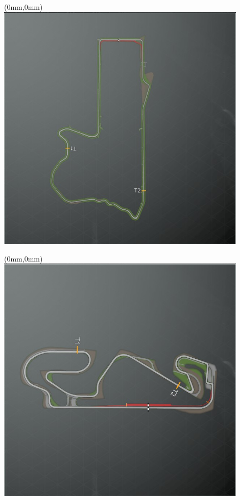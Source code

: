 \null\newpage
\begin{textblock*}{30mm}(0mm,0mm)%
\includegraphics[width=120mm]{TR/2015-05-20_00036.png}
\end{textblock*}
\null\newpage
\begin{textblock*}{30mm}(0mm,0mm)%
\includegraphics[width=120mm]{TR/2015-05-20_00018.png}
\end{textblock*}
